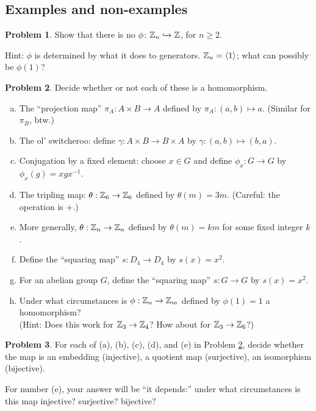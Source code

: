 \documentclass[12pt]{article}
\theoremstyle{definition} %
\newtheorem{problem}{Problem}
\newcommand\inv{^{-1}} %
\begin{document}
\subsection*{Examples and non-examples}

\begin{problem}
    Show that there is no  $\phi\colon\mathbb{Z}_n\hookrightarrow\mathbb{Z}$, for $n\geq 2$. 
    
    Hint: $\phi$ is determined by what it does to generators. $\mathbb{Z}_n = \langle1\rangle$; what can possibly be $\phi(1)$?
\end{problem}

\begin{problem}\label{examples}
    Decide whether or not each of these is a homomorphism.
    \begin{enumerate}[(a)]
        \item The ``projection map'' $\pi_A: A\times B \to A$ defined by $\pi_A:(a, b) \mapsto a$. (Similar for $\pi_B$, btw.)
        \item The ol' switcheroo: define $\gamma:A\times B \to B\times A$ by $\gamma:(a, b) \mapsto (b,a).$
        \item Conjugation by a fixed element: choose $x\in G$ and define $\phi_x:G\to G$ by $\phi_x(g) = xgx\inv$.
        \item The tripling map: $\theta:\mathbb{Z}_6\to \mathbb{Z}_6$ defined by $\theta(m) = 3m$. (Careful: the operation is $+$.)
        \item More generally, $\theta:\mathbb{Z}_n \to \mathbb{Z}_n$ defined by $\theta(m) = km$ for some fixed integer $k$.
        \item Define the ``squaring map'' $s: D_4 \to D_4$ by $s(x) = x^2$. 
        \item For an abelian group $G$, define the ``squaring map'' $s:G \to G$ by $s(x) = x^2$.
        \item Under what circumstances is $\phi:\mathbb{Z}_n \to \mathbb{Z}_m$ defined by $\phi(1) = 1$ a homomorphism? \\(Hint: Does this work for $\mathbb{Z}_3 \to \mathbb{Z}_4$? How about for $\mathbb{Z}_3 \to \mathbb{Z}_6$?)
    \end{enumerate}
\end{problem}

\begin{problem}
    For each of (a), (b), (c), (d), and (e) in Problem \ref{examples}, decide whether the map is an embedding (injective), a quotient map (surjective), an isomorphism (bijective).
    
    For number (e), your answer will be ``it depends:'' under what circumstances is this map injective? surjective? bijective?
\end{problem}
\end{document}
